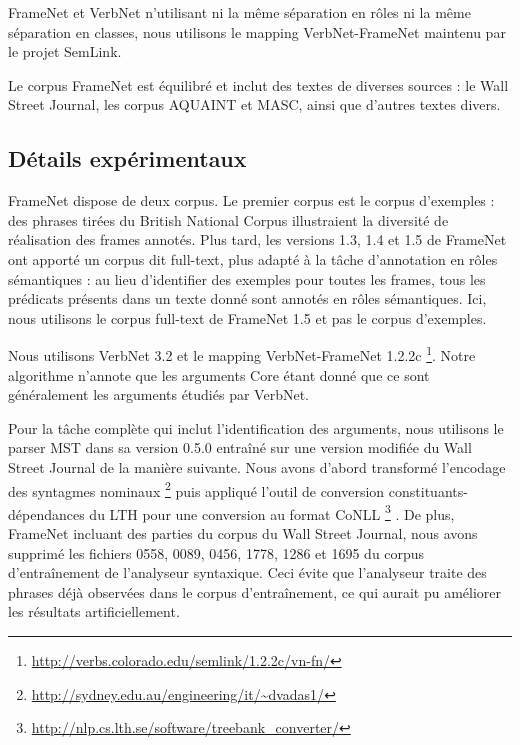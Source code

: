FrameNet et VerbNet n'utilisant ni la même séparation en rôles ni la même
séparation en classes, nous utilisons le mapping VerbNet-FrameNet maintenu par
le projet SemLink.

Le corpus FrameNet est équilibré et inclut des textes de diverses sources : le
Wall Street Journal, les corpus AQUAINT et MASC, ainsi que d'autres textes
divers.

\subsection{Détails expérimentaux}
\label{subsec:details_exp}

FrameNet dispose de deux corpus. Le premier corpus est le corpus d'exemples :
des phrases tirées du British National Corpus illustraient la diversité de
réalisation des frames annotés. Plus tard, les versions 1.3, 1.4 et 1.5 de
FrameNet ont apporté un corpus dit full-text, plus adapté à la tâche
d'annotation en rôles sémantiques : au lieu d'identifier des exemples pour
toutes les frames, tous les prédicats présents dans un texte donné sont annotés
en rôles sémantiques. Ici, nous utilisons le corpus full-text de FrameNet 1.5
et pas le corpus d'exemples.

Nous utilisons VerbNet 3.2 et le mapping VerbNet-FrameNet 1.2.2c
\footnote{\url{http://verbs.colorado.edu/semlink/1.2.2c/vn-fn/}}. Notre
algorithme n'annote que les arguments Core étant donné que ce sont généralement
les arguments étudiés par VerbNet.

Pour la tâche complète qui inclut l'identification des arguments, nous
utilisons le parser MST dans sa version 0.5.0 \citep{mcdonald2006multilingual}
entraîné sur une version modifiée du Wall Street Journal de la manière
suivante. Nous avons d'abord transformé l'encodage des syntagmes nominaux
\footnote{\url{http://sydney.edu.au/engineering/it/~dvadas1/}}
\citep{vadas2007adding} puis appliqué l'outil de conversion
constituants-dépendances du LTH pour une conversion au format CoNLL
\footnote{\url{http://nlp.cs.lth.se/software/treebank_converter/}}
\citep{johansson2007extended}. De plus, FrameNet incluant des parties du corpus
du Wall Street Journal, nous avons supprimé les fichiers 0558, 0089, 0456,
1778, 1286 et 1695 du corpus d'entraînement de l'analyseur syntaxique. Ceci
évite que l'analyseur traite des phrases déjà observées dans le corpus
d'entraînement, ce qui aurait pu améliorer les résultats artificiellement.

